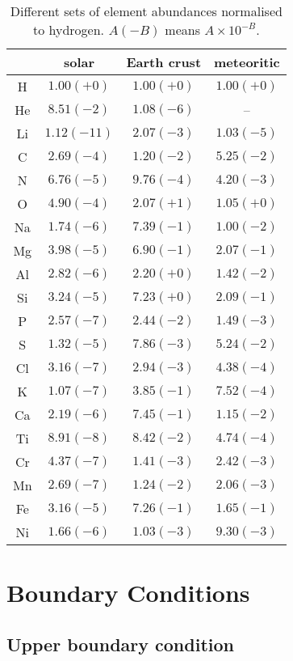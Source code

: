 \documentclass[11pt]{article}
\begin{document}
\begin{table}
\centering
\caption{Different sets of element abundances normalised to hydrogen. 
$A(-B)$ means $A\times 10^{-B}$.}
\label{tab:eps}
\vspace*{2mm}
\begin{tabular}{cccc}
\hline
     &     solar & Earth crust & meteoritic \\
\hline
 H   & $1.00(+0)$ &   $1.00(+0)$ &   $1.00(+0)$ \\
 He  & $8.51(-2)$ &   $1.08(-6)$ &   -- \\
 Li  & $1.12(-11)$ &  $2.07(-3)$ &   $1.03(-5)$ \\
 C   & $2.69(-4)$ &   $1.20(-2)$ &   $5.25(-2)$ \\
 N   & $6.76(-5)$ &   $9.76(-4)$ &   $4.20(-3)$ \\
 O   & $4.90(-4)$ &   $2.07(+1)$ &   $1.05(+0)$ \\
 Na  & $1.74(-6)$ &   $7.39(-1)$ &   $1.00(-2)$ \\
 Mg  & $3.98(-5)$ &   $6.90(-1)$ &   $2.07(-1)$ \\
 Al  & $2.82(-6)$ &   $2.20(+0)$ &   $1.42(-2)$ \\
 Si  & $3.24(-5)$ &   $7.23(+0)$ &   $2.09(-1)$ \\
 P   & $2.57(-7)$ &   $2.44(-2)$ &   $1.49(-3)$ \\
 S   & $1.32(-5)$ &   $7.86(-3)$ &   $5.24(-2)$ \\
 Cl  & $3.16(-7)$ &   $2.94(-3)$ &   $4.38(-4)$ \\
 K   & $1.07(-7)$ &   $3.85(-1)$ &   $7.52(-4)$ \\
 Ca  & $2.19(-6)$ &   $7.45(-1)$ &   $1.15(-2)$ \\
 Ti  & $8.91(-8)$ &   $8.42(-2)$ &   $4.74(-4)$ \\
 Cr  & $4.37(-7)$ &   $1.41(-3)$ &   $2.42(-3)$ \\
 Mn  & $2.69(-7)$ &   $1.24(-2)$ &   $2.06(-3)$ \\
 Fe  & $3.16(-5)$ &   $7.26(-1)$ &   $1.65(-1)$ \\
 Ni  & $1.66(-6)$ &   $1.03(-3)$ &   $9.30(-3)$ \\
\hline
\end{tabular}
\end{table}


\section{Boundary Conditions}
\subsection{Upper boundary condition}
\label{UpperBound}
\end{document}
